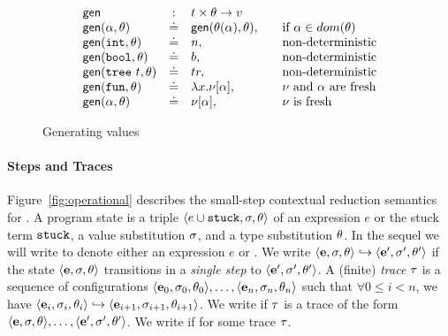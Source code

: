 \begin{figure}[ht]
$$
\begin{array}{lcll}
\gensym       & :   & t \times \tsu \rightarrow v \\
\gen{\thole}{\tsu}  & \defeq  & \gen{\subst{\tsu}{\thole}}{\tsu}, & \quad \text{if } \thole \in dom(\tsu) \\
\gen{\tint}{\tsu}   & \defeq  & n, & \quad \text{non-deterministic} \\
\gen{\tbool}{\tsu}  & \defeq  & b, & \quad \text{non-deterministic} \\
\gen{\ttree{t}}{\tsu}  & \defeq  & tr, & \quad \text{non-deterministic} \\
\gen{\tfun}{\tsu}   & \defeq & \efun{x}{\vhole{\thole}}, & \quad \text{\ehole and \thole are fresh} \\
\gen{\thole}{\tsu}  & \defeq & \vhole{\thole}, & \quad \text{\ehole is fresh} \\
\end{array}
$$
\caption{Generating values}
\label{fig:gen}
\end{figure}


\paragraph{Steps and Traces}

%
Figure~\ref{fig:operational} describes the small-step contextual
reduction semantics for \lang.
%
A program state is a triple $\langle e \cup \mathtt{stuck}, \sigma, \theta \rangle$ of an
expression $e$ or the stuck term $\mathtt{stuck}$, a value substitution $\sigma$,
and a type substitution $\theta$. In the sequel we will write \estuck to
denote either an expression $e$ or \stuck.
%
We write $\langle \mathbf{e}, \sigma, \theta \rangle \hookrightarrow \langle \mathbf{e}', \sigma', \theta' \rangle$ if the state
$\langle \mathbf{e}, \sigma, \theta \rangle$ transitions in a \emph{single step} to
$\langle \mathbf{e}', \sigma', \theta' \rangle$.
%
A (finite) \emph{trace} $\tau$ is a sequence of configurations
$\langle \mathbf{e}_0, \sigma_0, \theta_0 \rangle, \ldots, \langle \mathbf{e}_n, \sigma_n, \theta_n \rangle$ such that
$\forall 0 \leq i < n$, we have
$\langle \mathbf{e}_i, \sigma_i, \theta_i \rangle \hookrightarrow \langle \mathbf{e}_{i+1}, \sigma_{i+1}, \theta_{i+1} \rangle$.
%
We write  if $\tau$ is
a trace of the form $\langle \mathbf{e}, \sigma, \theta \rangle,\ldots,\langle \mathbf{e}', \sigma', \theta' \rangle$.
%
We write  if
 for some trace $\tau$.

